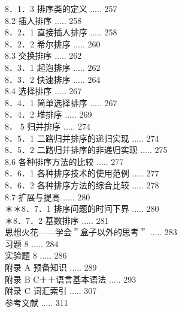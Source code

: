 \documentclass[10pt]{article}
\begin{document}
8．1．3 排序类的定义 ..... 257\\
8.2 插人排序 ..... 258\\
8．2．1 直接插人排序 ..... 258\\
8．2．2 希尔排序 ..... 260\\
8.3 交换排序 ..... 262\\
8．3．1 起泡排序 ..... 262\\
8．3．2 快速排序 ..... 264\\
8.4 选择排序 ..... 267\\
8．4．1 简单选择排序 ..... 267\\
8．4．2 堆排序 ..... 269\\
8． 5 归并排序 ..... 274\\
8．5．1 二路归并排序的递归实现 ..... 274\\
8．5．2 二路归并排序的非递归实现 ..... 275\\
8.6 各种排序方法的比较 ..... 277\\
8．6．1 各种排序技术的使用范例 ..... 277\\
8．6．2 各种排序方法的综合比较 ..... 278\\
8.7 扩展与提高 ..... 280\\
＊＊8．7．1 排序问题的时间下界 ..... 280\\
＊8．7．2 基数排序 ..... 281\\
思想火花——学会＂盒子以外的思考＂ ..... 283\\
习题 8 ..... 284\\
实验题 8 ..... 286\\
附录 A 预备知识 ..... 289\\
附录 B C＋＋语言基本语法 ..... 293\\
附录 C 词汇索引 ..... 307\\
参考文献 ..... 311
\end{document}
